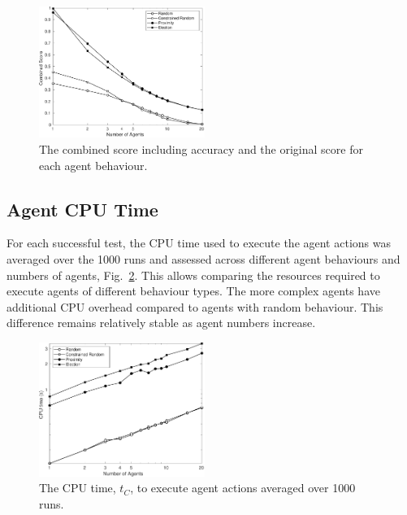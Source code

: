 \documentclass[letterpaper, 10 pt, journal, twoside]{IEEEtran}
\begin{document}
\begin{figure}[!t]
	\centering
\includegraphics[width=0.48\textwidth]{Combined.pdf}
	\caption{The combined score including accuracy and the original score for each agent behaviour.}
	\label{f:combined}
\end{figure}

\subsection{Agent CPU Time}
For each successful test, the CPU time used to execute the agent actions was averaged over the 1000 runs and assessed across different agent behaviours and numbers of agents, Fig.~\ref{f:cputime}. This allows comparing the resources required to execute agents of different behaviour types. The more complex agents have additional CPU overhead compared to agents with random behaviour. This difference remains relatively stable as agent numbers increase.

\begin{figure}[!t]
	\centering
\includegraphics[width=0.48\textwidth]{TimeCPU.pdf}
	\caption{The CPU time, $t_{C}$, to execute agent actions averaged over 1000 runs.}
	\label{f:cputime}
\end{figure}

\end{document}
